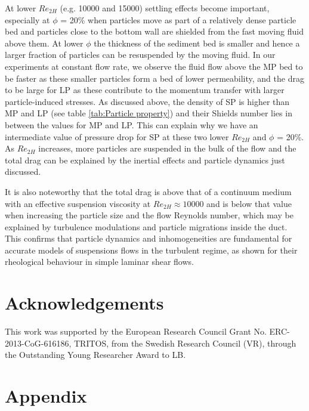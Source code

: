 \documentclass{jfm}
\begin{document}
At lower $Re_{2H}$ (e.g. 10000 and 15000) settling effects become important, especially at $\phi$ = 20\% when particles move as part of a relatively dense particle bed and particles close to the bottom wall are shielded from the fast moving fluid above them. 
At lower $\phi$ the thickness of the sediment bed is smaller and hence a larger fraction of particles can be resuspended by the moving fluid. 
%
%
In our experiments at constant flow rate, we observe the fluid flow above the MP bed to be faster as these smaller particles form a bed of lower permeability, and the drag to be large for LP as these contribute to the momentum transfer with larger particle-induced stresses.
As discussed above, the density of SP is higher than MP and LP (see table \ref{tab:Particle property}) and their Shields number lies in between the values for MP and LP. This can explain why we have an intermediate value of pressure drop for SP at these two lower $Re_{2H}$ and  $\phi$ = 20\%. 
As $Re_{2H}$ increases, more particles are suspended in the bulk of the flow and the total drag can be explained by the inertial effects and particle dynamics just discussed. 

It is also noteworthy that the total drag is above that of a continuum medium with an effective suspension viscosity at $Re_{2H} \approx 10000$ and is below that value when increasing the particle size and the flow Reynolds number, which may be explained by turbulence modulations and particle migrations inside the duct. This confirms that particle dynamics and inhomogeneities are fundamental for accurate models of suspensions flows in the turbulent regime, as shown for their rheological behaviour in simple laminar shear flows.

\section*{Acknowledgements}

This work was supported by the European Research Council Grant No. ERC-2013-CoG-616186, TRITOS, from the Swedish Research Council (VR), through the Outstanding Young Researcher Award to LB.





\section*{Appendix}
\label{sec:Appendix}
\end{document}

